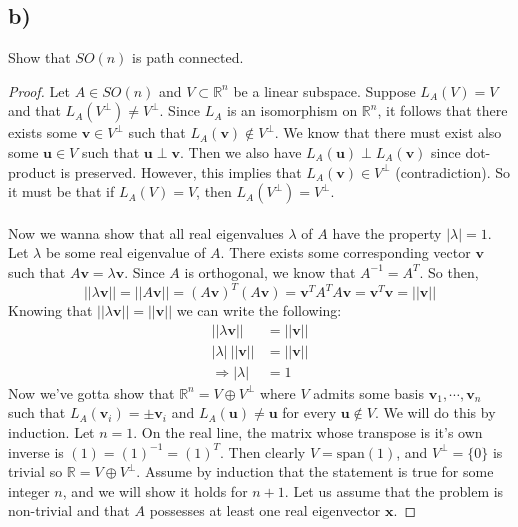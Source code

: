 \documentclass{article}
\theoremstyle{definition}
\begin{document}
\subsection*{b)}
\begin{mdframed}[]
    Show that $SO(n)$ is path connected.
\end{mdframed}
\begin{proof}
     Let $A \in SO(n)$ and $V \subset \mathbb{R}^n$ be a linear subspace.
    Suppose $L_A(V) = V$ and that $L_A(V^\perp) \neq V^\perp$. Since $L_A$ is an isomorphism on $\mathbb{R}^n$,
    it follows that there exists some $\bm v \in V^\perp$ such that $L_A(\bm v) \notin V^\perp$.
    We know that there must exist also some $\bm u \in V$ such that $\bm u \perp \bm v$. Then we also have 
    $L_A(\bm u) \perp L_A(\bm v)$ since dot-product is preserved. However, this implies that $L_A(\bm v) \in V^\perp$ (contradiction).
    So it must be that if $L_A(V) = V$, then $L_A(V^\perp) = V^\perp$.
    \\\\
     Now we wanna show that all real eigenvalues $\lambda$ of $A$ have the property $|\lambda| = 1$.
    Let $\lambda$ be some real eigenvalue of $A$. There exists some corresponding vector $\bm v$ such that 
    $A\bm v = \lambda \bm v$. Since $A$ is orthogonal, we know that $A^{-1} = A^T$. So then,
    \[
        ||\lambda \bm v|| = ||A \bm v|| = (A\bm v)^T(A \bm v) = \bm v^T A^T A \bm v = \bm v^T \bm v = ||\bm v||
    \]
    Knowing that $||\lambda \bm v|| = ||\bm v||$ we can write the following:
    \begin{align*}
        ||\lambda \bm v|| &= ||\bm v||\\
        |\lambda| \ ||\bm v|| &= ||\bm v|| \\
        \Rightarrow |\lambda| &= 1
    \end{align*}
    Now we've gotta show that $\mathbb{R}^n = V \oplus V^\perp$ where $V$ admits some basis $\bm v_1,\cdots,\bm v_n$
    such that $L_A(\bm v_i) = \pm \bm v_i$ and $L_A(\bm u) \neq \bm u$ for every $\bm u \notin V$. We will do this by 
    induction. Let $n = 1$. On the real line, the matrix whose transpose is it's own inverse is $(1) = (1)^{-1} = (1)^T$.
    Then clearly $V = \text{span}(1)$, and $V^\perp = \{0\}$ is trivial so $\mathbb{R} = V \oplus V^\perp$. Assume by 
    induction that the statement is true for some integer $n$, and we will show it holds for $n+1$.
    Let us assume that the problem is non-trivial and that $A$ possesses at least one real eigenvector $\bm x$.

\end{proof}
\end{document}
